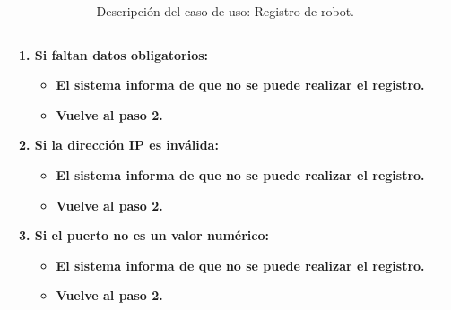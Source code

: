\begin{table}[H]
\begin{center}
\begin{tabular}{|p{3.5cm}|p{10cm}|}
{\begin{enumerate}
          \item Si faltan datos obligatorios:
          \begin{itemize}
           \item El sistema informa de que no se puede realizar el registro.
           \item Vuelve al paso 2.
          \end{itemize}
	  \item Si la dirección IP es inválida:
	    \begin{itemize}
	      \item El sistema informa de que no se puede realizar el registro.
	      \item Vuelve al paso 2.
	   \end{itemize}
	   
	  \item Si el puerto no es un valor numérico:
	    \begin{itemize}
	      \item El sistema informa de que no se puede realizar el registro.
	      \item Vuelve al paso 2.
	   \end{itemize}
	   
         \end{enumerate}
         }\\
     \hline
    \end{tabular}
  \end{center}
\caption{Descripción del caso de uso: Registro de robot.}
\end{table}



